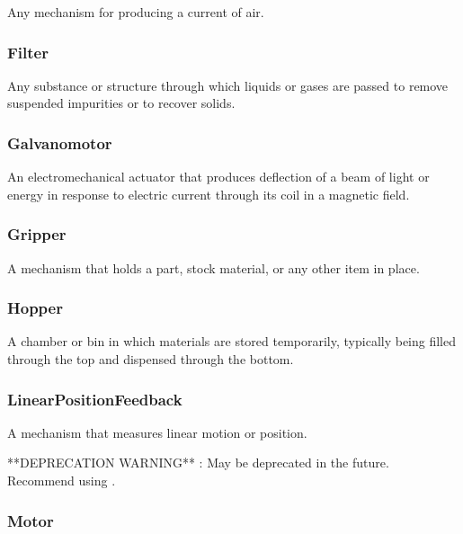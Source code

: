 Any mechanism for producing a current of air.

\FloatBarrier

\subsubsection{Filter}
  \label{sec:Filter}


Any substance or structure through which liquids or gases are passed to remove suspended impurities or to recover solids.

\FloatBarrier

\subsubsection{Galvanomotor}
  \label{sec:Galvanomotor}


An electromechanical actuator that produces deflection of a beam of light or energy in response to electric current through its coil in a magnetic field.

\FloatBarrier

\subsubsection{Gripper}
  \label{sec:Gripper}


A mechanism that holds a part, stock material, or any other item in place.

\FloatBarrier

\subsubsection{Hopper}
  \label{sec:Hopper}


A chamber or bin in which materials are stored temporarily, typically being filled through the top and dispensed through the bottom.

\FloatBarrier

\subsubsection{LinearPositionFeedback}
  \label{sec:LinearPositionFeedback}


A mechanism that measures linear motion or position.

**DEPRECATION WARNING** : May be deprecated in the future. Recommend using .

\FloatBarrier

\subsubsection{Motor}
  \label{sec:Motor}


